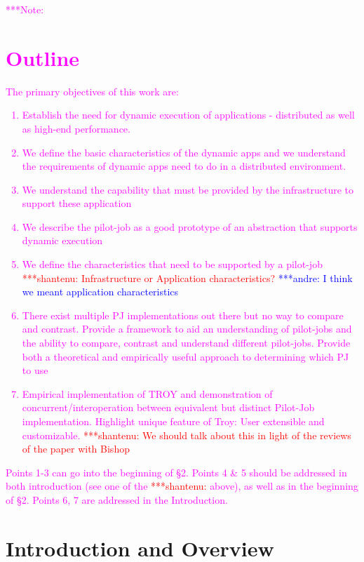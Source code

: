 \documentclass[conference,final]{IEEEtran}
\newcommand{\jhanote}[1]{ {\textcolor{red} { ***shantenu: #1 }}}
\newcommand{\alnote}[1]{ {\textcolor{blue} { ***andre: #1 }}}
\newcommand{\note}[1]{ {\textcolor{magenta} { ***Note: #1 }}}
\newcommand{\alnote}[1]{}
\newcommand{\jhanote}[1]{}
\newcommand{\note}[1]{}
\newcommand{\upp}{\vspace*{-0.5em}}
\begin{document}
\note{
\section*{Outline}
The primary objectives of this work are:
\begin{enumerate}
\item Establish the need for dynamic execution of applications -
  distributed as well as high-end performance.
\item We define the basic characteristics of the dynamic apps and we
  understand the requirements of dynamic apps need to do in a
  distributed environment.
\item We understand the capability that must be provided by the
  infrastructure to support these application
\item We describe the pilot-job as a good prototype of an abstraction
  that supports dynamic execution
\item We define the characteristics that need to be supported by a
  pilot-job \jhanote{Infrastructure or Application characteristics?}
  \alnote{I think we meant application characteristics}
\item There exist multiple PJ implementations out there but no way to
  compare and contrast. Provide a framework to aid an understanding of
  pilot-jobs and the ability to compare, contrast and understand
  different pilot-jobs.  Provide both a theoretical and empirically
  useful approach to determining which PJ to use
\item Empirical implementation of TROY and demonstration of
  concurrent/interoperation between equivalent but distinct Pilot-Job
  implementation. Highlight unique feature of Troy: User extensible
  and customizable. \jhanote{We should talk about this in light of the
    reviews of the paper with Bishop}
\end{enumerate}
Points 1-3 can go into the beginning of \S2.  Points 4 \& 5 should be
addressed in both introduction (see one of the \jhanote{} above), as
well as in the beginning of \S2. Points 6, 7 are addressed in the
Introduction.
}

\section{Introduction and Overview \upp\upp}

 
\end{document}
